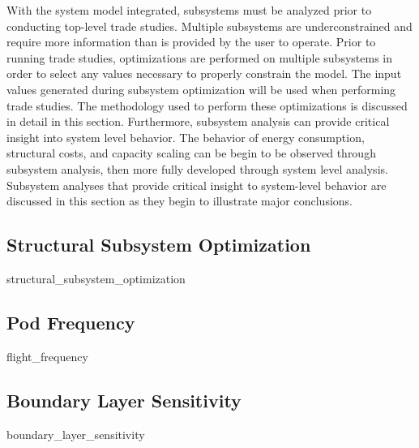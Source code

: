 With the system model integrated, subsystems must be analyzed prior to conducting top-level trade studies. Multiple subsystems are underconstrained and require more information than is provided by the user to operate. Prior to running trade studies, optimizations are performed on multiple subsystems in order to select any values necessary to properly constrain the model. The input values generated during subsystem optimization will be used when performing trade studies. The methodology used to perform these optimizations is discussed in detail in this section. Furthermore, subsystem analysis can provide critical insight into system level behavior. The behavior of energy consumption, structural costs, and capacity scaling can be begin to be observed through subsystem analysis, then more fully developed through system level analysis. Subsystem analyses that provide critical insight to system-level behavior are discussed in this section as they begin to illustrate major conclusions.
\subsection{Structural Subsystem Optimization}
	{structural_subsystem_optimization}
\subsection{Pod Frequency}
	{flight_frequency}
\subsection{Boundary Layer Sensitivity}
	{boundary_layer_sensitivity}
